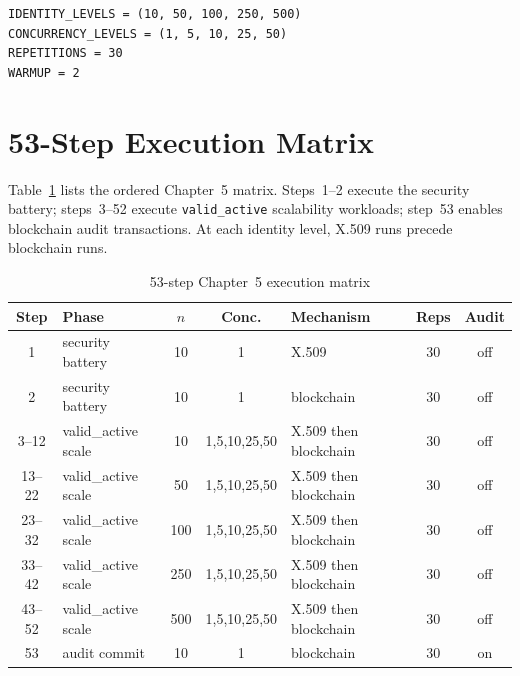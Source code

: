 \begin{lstlisting}[style=python,caption={Matrix constants (\texttt{scripts/run\_chapter5\_matrix.py})},label=lst:matrix-constants]
IDENTITY_LEVELS = (10, 50, 100, 250, 500)
CONCURRENCY_LEVELS = (1, 5, 10, 25, 50)
REPETITIONS = 30
WARMUP = 2
\end{lstlisting}

\section{53-Step Execution Matrix}
\label{app:matrix}

Table~\ref{tab:app-matrix} lists the ordered Chapter~5 matrix. Steps~1--2 execute the security battery; steps~3--52 execute \texttt{valid\_active} scalability workloads; step~53 enables blockchain audit transactions. At each identity level, X.509 runs precede blockchain runs.

\begin{table}[htbp]
    \centering
    \caption{53-step Chapter~5 execution matrix}
    \label{tab:app-matrix}
    \small
    \begin{tabular}{|c|l|c|c|l|c|c|}
        \hline
        \textbf{Step} & \textbf{Phase} & \textbf{$n$} & \textbf{Conc.} & \textbf{Mechanism} & \textbf{Reps} & \textbf{Audit} \\
        \hline
        1 & security battery & 10 & 1 & X.509 & 30 & off \\
        \hline
        2 & security battery & 10 & 1 & blockchain & 30 & off \\
        \hline
        3--12 & valid\_active scale & 10 & 1,5,10,25,50 & X.509 then blockchain & 30 & off \\
        \hline
        13--22 & valid\_active scale & 50 & 1,5,10,25,50 & X.509 then blockchain & 30 & off \\
        \hline
        23--32 & valid\_active scale & 100 & 1,5,10,25,50 & X.509 then blockchain & 30 & off \\
        \hline
        33--42 & valid\_active scale & 250 & 1,5,10,25,50 & X.509 then blockchain & 30 & off \\
        \hline
        43--52 & valid\_active scale & 500 & 1,5,10,25,50 & X.509 then blockchain & 30 & off \\
        \hline
        53 & audit commit & 10 & 1 & blockchain & 30 & on \\
        \hline
    \end{tabular}
\end{table}

